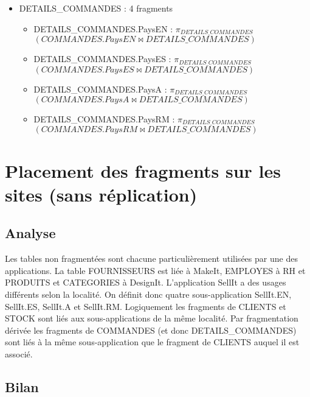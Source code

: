 \documentclass[10pt,a4paper,twoside]{article}
\begin{document}
\begin{itemize}
\item DETAILS\_COMMANDES : 4 fragments
\begin{itemize}
\item DETAILS\_COMMANDES.PaysEN : $\pi_{DETAILS\_COMMANDES}$\\
$(COMMANDES.PaysEN \bowtie DETAILS\_COMMANDES)$
\item DETAILS\_COMMANDES.PaysES : $\pi_{DETAILS\_COMMANDES}$\\
$(COMMANDES.PaysES \bowtie DETAILS\_COMMANDES)$
\item DETAILS\_COMMANDES.PaysA : $\pi_{DETAILS\_COMMANDES}$\\
$(COMMANDES.PaysA \bowtie DETAILS\_COMMANDES)$
\item DETAILS\_COMMANDES.PaysRM : $\pi_{DETAILS\_COMMANDES}$\\
$(COMMANDES.PaysRM \bowtie DETAILS\_COMMANDES)$
\end{itemize}
\end{itemize}

\section{Placement des fragments sur les sites (sans réplication)}
\subsection{Analyse}
Les tables non fragmentées sont chacune particulièrement utilisées par une des applications. La table FOURNISSEURS est liée à MakeIt, EMPLOYES à RH et PRODUITS et CATEGORIES à DesignIt. L'application SellIt a des usages différents selon la localité. On définit donc quatre sous-application SellIt.EN, SellIt.ES, SellIt.A et SellIt.RM. Logiquement les fragments de CLIENTS et STOCK sont liés aux sous-applications de la même localité. Par fragmentation dérivée les fragments de COMMANDES (et donc DETAILS\_COMMANDES) sont liés à la même sous-application que le fragment de CLIENTS auquel il est associé.
\subsection{Bilan}
\end{document}
